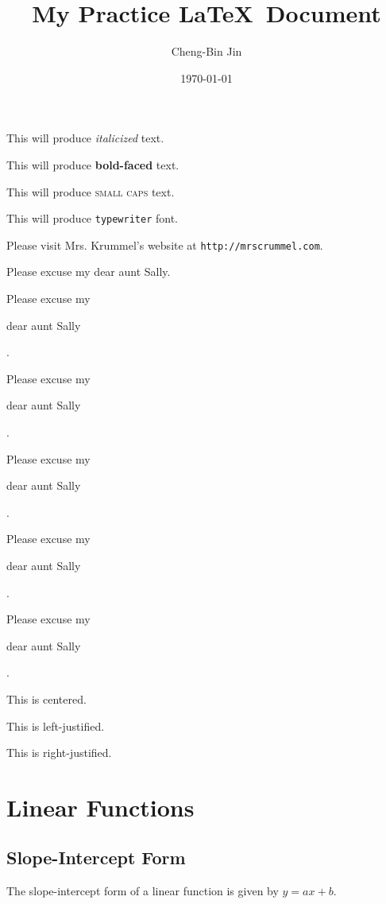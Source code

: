 \documentclass[11pt]{article}
\begin{document}
\tableofcontents

\title{My Practice \LaTeX \ Document}
\author{Cheng-Bin Jin}
\date{\today}
\maketitle

This will produce \textit{italicized} text.

This will produce \textbf{bold-faced} text.

This will produce \textsc{small caps} text.

This will produce \texttt{typewriter} font.

Please visit Mrs. Krummel's website at \texttt{http://mrscrummel.com}.

Please excuse my dear aunt Sally.

Please excuse my \begin{large}dear aunt Sally\end{large}.

Please excuse my \begin{Large}dear aunt Sally\end{Large}.

Please excuse my \begin{Huge}dear aunt Sally\end{Huge}.

Please excuse my \begin{small}dear aunt Sally\end{small}.

Please excuse my \begin{tiny}dear aunt Sally\end{tiny}.

\begin{center}This is centered.\end{center}

\begin{flushleft}This is left-justified.\end{flushleft}

\begin{flushright}This is right-justified.\end{flushright}

\section{Linear Functions}
	\subsection{Slope-Intercept Form}
	The slope-intercept form of a linear function is given by $y=ax+b$.
\end{document}
